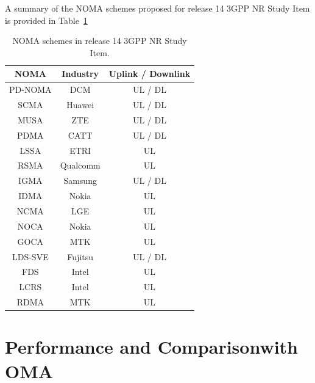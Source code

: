 \begin{multicols}{2}
A summary of the NOMA schemes proposed for release 14 3GPP NR Study Item is provided in Table~\ref{Tab_3GPP}
\begin{table}[H]
\centering
\caption{NOMA schemes in release 14 3GPP NR Study Item.} \label{Tab_3GPP}
\medskip
\renewcommand{\arraystretch}{1.17}
\begin{tabular}{|c|c|c|}
\hline
\textbf{NOMA}    & \textbf{Industry} & \textbf{Uplink / Downlink} \\ \hline
PD-NOMA \cite{Benjebbour_CSCN_2015} & DCM      & UL / DL           \\ \hline
SCMA \cite{Nikopour_PIMRC_2013}    & Huawei   & UL / DL           \\ \hline
MUSA \cite{Yuan_VTC_2016}   & ZTE      & UL / DL           \\ \hline
PDMA \cite{Dai_WC_2018}    & CATT     & UL / DL           \\ \hline
LSSA    & ETRI     & UL                \\ \hline
RSMA    & Qualcomm & UL                \\ \hline
IGMA    & Samsung  & UL / DL           \\ \hline
IDMA \cite{Kusume_TWC_2012}    & Nokia    & UL                \\ \hline
NCMA    & LGE      & UL                \\ \hline
NOCA    & Nokia    & UL                \\ \hline
GOCA    & MTK      & UL                \\ \hline
LDS-SVE & Fujitsu  & UL / DL           \\ \hline
FDS     & Intel    & UL                \\ \hline
LCRS    & Intel    & UL                \\ \hline
RDMA    & MTK      & UL                \\ \hline
\end{tabular}
\end{table}


\section{Performance and Comparison\hfill\break with OMA} \label{SecNOMAOMA}


\end{multicols}
